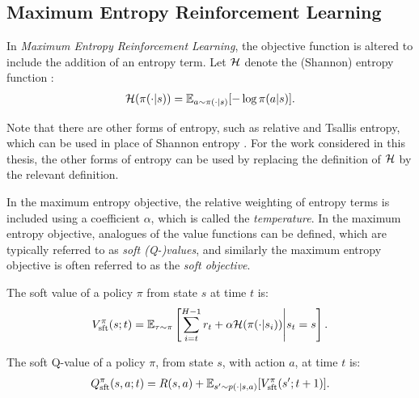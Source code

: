 

    \subsection{Maximum Entropy Reinforcement Learning}
    \label{sec:2-2-merl}

        In \textit{Maximum Entropy Reinforcement Learning}, the objective function is altered to include the addition of an entropy term. Let $\mathcal{H}$ denote the (Shannon) entropy function :
        \begin{align}
            \mathcal{H}(\pi(\cdot|s)) = \mathbb{E}_{a\sim\pi(\cdot|s)}[-\log \pi(a|s)].
        \end{align}

        Note that there are other forms of entropy, such as relative and Tsallis entropy, which can be used in place of Shannon entropy . For the work considered in this thesis, the other forms of entropy can be used by replacing the definition of $\mathcal{H}$ by the relevant definition.

        In the maximum entropy objective, the relative weighting of entropy terms is included using a coefficient $\alpha$, which is called the \textit{temperature}. In the maximum entropy objective, analogues of the value functions can be defined, which are typically referred to as \textit{soft (Q-)values}, and similarly the maximum entropy objective is often referred to as the \textit{soft objective}.

        \begin{defn}
            \label{def:sft_value}
            \label{def:sft_q_value}
            The \textnormal{soft value} of a policy $\pi$ from state $s$ at time $t$ is:
            \begin{align}
                V_{{\textnormal{sft}}}^{\pi}(s;t) = \mathbb{E}_{\tau\sim\pi}\left[\sum_{i=t}^{H-1} r_t + \alpha\mathcal{H}(\pi(\cdot|s_i)) \Bigg| s_t=s \right].
            \end{align} 

            The \textnormal{soft Q-value} of a policy $\pi$, from state $s$, with action $a$, at time $t$ is:
            \begin{align}
                Q_{{\textnormal{sft}}}^{\pi}(s,a;t) = R(s,a) + \mathbb{E}_{s'\sim p(\cdot|s,a)} [V_{{\textnormal{sft}}}^{\pi}(s';t+1)].
            \end{align} 
        \end{defn}

